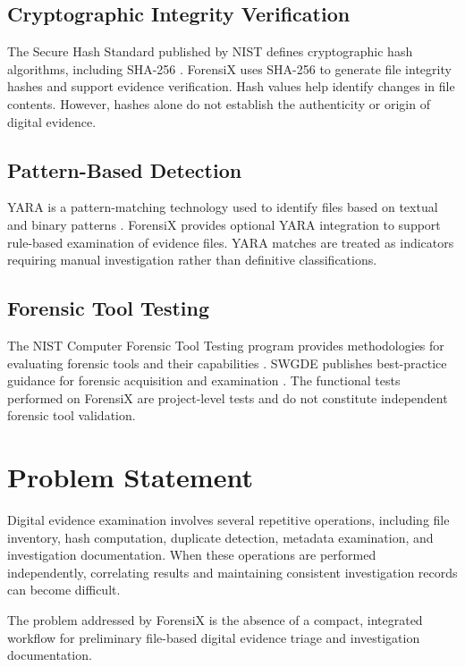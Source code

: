 \documentclass[conference]{IEEEtran}
\begin{document}
\subsection{Cryptographic Integrity Verification}
The Secure Hash Standard published by NIST defines cryptographic hash algorithms, including SHA-256 \cite{fips180}. ForensiX uses SHA-256 to generate file integrity hashes and support evidence verification. Hash values help identify changes in file contents. However, hashes alone do not establish the authenticity or origin of digital evidence.

\subsection{Pattern-Based Detection}
YARA is a pattern-matching technology used to identify files based on textual and binary patterns \cite{yara}. ForensiX provides optional YARA integration to support rule-based examination of evidence files. YARA matches are treated as indicators requiring manual investigation rather than definitive classifications.

\subsection{Forensic Tool Testing}
The NIST Computer Forensic Tool Testing program provides methodologies for evaluating forensic tools and their capabilities \cite{cftt}. SWGDE publishes best-practice guidance for forensic acquisition and examination \cite{swgdeacq,swgdeexam}. The functional tests performed on ForensiX are project-level tests and do not constitute independent forensic tool validation.

\section{Problem Statement}
Digital evidence examination involves several repetitive operations, including file inventory, hash computation, duplicate detection, metadata examination, and investigation documentation. When these operations are performed independently, correlating results and maintaining consistent investigation records can become difficult.

The problem addressed by ForensiX is the absence of a compact, integrated workflow for preliminary file-based digital evidence triage and investigation documentation.
\end{document}
